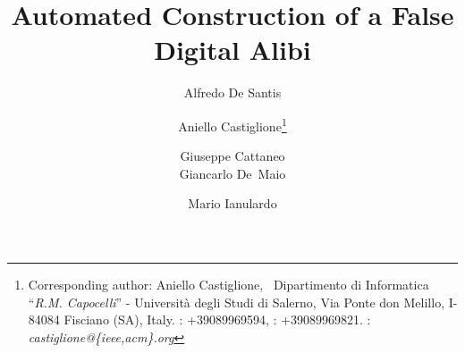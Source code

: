 \documentclass[runningheads]{llncs}
\begin{document}
\mainmatter  %

\title{Automated Construction of a False Digital Alibi}


%
%
\author{Alfredo De Santis \and Aniello Castiglione\thanks{Corresponding author: Aniello Castiglione, \Letter~Dipartimento di Informatica ``\textit{R.M. Capocelli}'' - Universit\`a degli Studi di Salerno, Via Ponte don Melillo, I-84084 Fisciano (SA), Italy. \Telefon: +39089969594, \Faxmachine: +39089969821. \Email: \emph{castiglione@\{ieee,acm\}.org}}
\and Giuseppe Cattaneo\\ Giancarlo De~Maio \and Mario Ianulardo}
%

%


%
%

\maketitle
\end{document}
